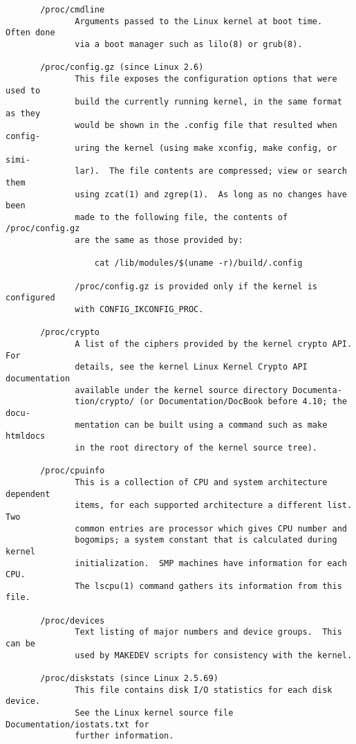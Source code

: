 \documentclass[]{article}
\begin{document}
\begin{verbatim}
       /proc/cmdline
              Arguments passed to the Linux kernel at boot time.  Often done
              via a boot manager such as lilo(8) or grub(8).

       /proc/config.gz (since Linux 2.6)
              This file exposes the configuration options that were used to
              build the currently running kernel, in the same format as they
              would be shown in the .config file that resulted when config‐
              uring the kernel (using make xconfig, make config, or simi‐
              lar).  The file contents are compressed; view or search them
              using zcat(1) and zgrep(1).  As long as no changes have been
              made to the following file, the contents of /proc/config.gz
              are the same as those provided by:

                  cat /lib/modules/$(uname -r)/build/.config

              /proc/config.gz is provided only if the kernel is configured
              with CONFIG_IKCONFIG_PROC.

       /proc/crypto
              A list of the ciphers provided by the kernel crypto API.  For
              details, see the kernel Linux Kernel Crypto API documentation
              available under the kernel source directory Documenta‐
              tion/crypto/ (or Documentation/DocBook before 4.10; the docu‐
              mentation can be built using a command such as make htmldocs
              in the root directory of the kernel source tree).

       /proc/cpuinfo
              This is a collection of CPU and system architecture dependent
              items, for each supported architecture a different list.  Two
              common entries are processor which gives CPU number and
              bogomips; a system constant that is calculated during kernel
              initialization.  SMP machines have information for each CPU.
              The lscpu(1) command gathers its information from this file.

       /proc/devices
              Text listing of major numbers and device groups.  This can be
              used by MAKEDEV scripts for consistency with the kernel.

       /proc/diskstats (since Linux 2.5.69)
              This file contains disk I/O statistics for each disk device.
              See the Linux kernel source file Documentation/iostats.txt for
              further information.


\end{verbatim}
\end{document}
